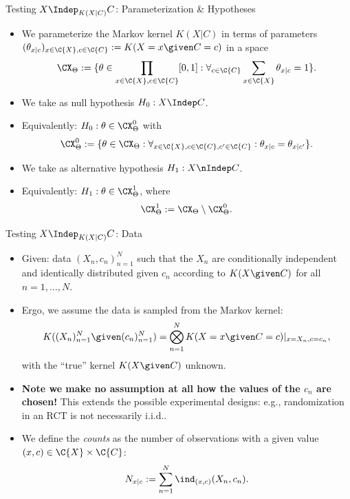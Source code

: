 \begin{frame}{Testing $X \Indep_{K(X|C)} C$: Parameterization \& Hypotheses}
  \begin{itemize}
    \item We parameterize the Markov kernel $K(X | C)$ in terms of parameters
$(\theta_{x|c})_{x\in\C{X},c\in\C{C}} := K(X = x \given C = c)$ in a space
      $$\CX_\Theta := \{ \theta \in \prod_{x\in\C{X},c\in\C{C}} [0,1] : \forall_{c\in\C{C}} \sum_{x\in\C{X}} \theta_{x|c} = 1\}.$$
    \item We take as null hypothesis $H_0 : X \Indep C$.
    \item Equivalently: $H_0 : \theta \in \CX_\Theta^0$ with 
      $$\CX_\Theta^0 := \{ \theta \in \CX_\Theta : \forall_{x\in\C{X},c\in\C{C},c'\in\C{C}}: \theta_{x|c} = \theta_{x|c'} \}.$$
    \item We take as alternative hypothesis $H_1 : X \nIndep C$.
    \item Equivalently: $H_1 : \theta \in \CX_\Theta^1$, where 
      $$\CX_\Theta^1 := \CX_\Theta \setminus \CX_\Theta^0.$$
  \end{itemize}
\end{frame}

\begin{frame}{Testing $X \Indep_{K(X|C)} C$: Data}
  \begin{itemize}
    \item Given: data $(X_n,c_n)_{n=1}^N$ such that the $X_n$ are conditionally independent and identically distributed given $c_n$ according to $K(X \given C)$ for all $n=1,\dots,N$.
    \item Ergo, we assume the data is sampled from the Markov kernel:
      $$K((X_n)_{n=1}^N \given (c_n)_{n=1}^N) = \bigotimes_{n=1}^N K(X=x \given C=c)|_{x=X_n,c=c_n},$$
with the ``true'' kernel $K(X \given C)$ unknown.
    \item \textbf{Note we make no assumption at all how the values of the $c_n$ are chosen!}
    This extends the possible experimental designs: e.g., randomization in an RCT is not necessarily i.i.d..
    \item We define the \emph{counts} as the number of observations with a given value $(x,c)\in\C{X}\times\C{C}$:
      $$N_{x|c} := \sum_{n=1}^N \ind_{(x,c)}(X_n,c_n).$$
  \end{itemize}
\end{frame}

